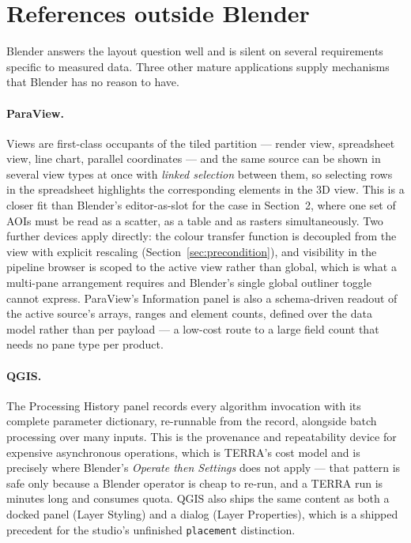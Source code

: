 \documentclass[11pt,a4paper]{article}
\newcommand{\code}[1]{\texttt{\small #1}}
\begin{document}
\section{References outside Blender}

Blender answers the layout question well and is silent on several requirements
specific to measured data. Three other mature applications supply mechanisms
that Blender has no reason to have.

\paragraph{ParaView.} Views are first-class occupants of the tiled partition ---
render view, spreadsheet view, line chart, parallel coordinates --- and the same
source can be shown in several view types at once with \emph{linked selection}
between them, so selecting rows in the spreadsheet highlights the corresponding
elements in the 3D view. This is a closer fit than Blender's editor-as-slot for
the case in Section~2, where one set of AOIs must be read as a scatter, as a
table and as rasters simultaneously. Two further devices apply directly: the
colour transfer function is decoupled from the view with explicit rescaling
(Section~\ref{sec:precondition}), and visibility in the pipeline browser is
scoped to the active view rather than global, which is what a multi-pane
arrangement requires and Blender's single global outliner toggle cannot express.
ParaView's Information panel is also a schema-driven readout of the active
source's arrays, ranges and element counts, defined over the data model rather
than per payload --- a low-cost route to a large field count that needs no pane
type per product.

\paragraph{QGIS.} The Processing History panel records every algorithm
invocation with its complete parameter dictionary, re-runnable from the record,
alongside batch processing over many inputs. This is the provenance and
repeatability device for expensive asynchronous operations, which is TERRA's
cost model and is precisely where Blender's \emph{Operate then Settings} does
not apply --- that pattern is safe only because a Blender operator is cheap to
re-run, and a TERRA run is minutes long and consumes quota. QGIS also ships the
same content as both a docked panel (Layer Styling) and a dialog (Layer
Properties), which is a shipped precedent for the studio's unfinished
\code{placement} distinction.
\end{document}
